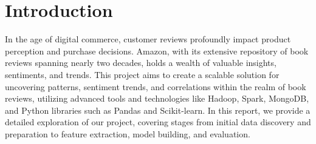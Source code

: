\section{Introduction}
In the age of digital commerce, customer reviews profoundly impact product perception and purchase decisions.
Amazon, with its extensive repository of book reviews spanning nearly two decades, holds a wealth of valuable insights,
sentiments, and trends. This project aims to create a scalable solution for uncovering patterns, sentiment trends,
and correlations within the realm of book reviews, utilizing advanced tools and technologies like Hadoop,
Spark, MongoDB, and Python libraries such as Pandas and Scikit-learn.
In this report, we provide a detailed exploration of our project, covering stages from initial data discovery
and preparation to feature extraction, model building, and evaluation.

